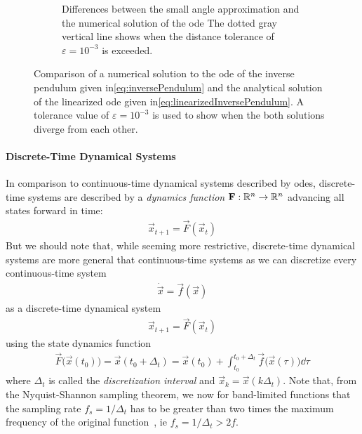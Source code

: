 \begin{figure}
\begin{subfigure}[t]{0.5\linewidth}
					\caption{Differences between the small angle approximation and the numerical solution of the \ac{ode}  The dotted gray vertical line shows when the distance tolerance of \( \varepsilon = 10^{-3} \) is exceeded.}
				\end{subfigure}
				\caption{Comparison of a numerical solution to the \ac{ode} of the inverse pendulum given in\eqref{eq:inversePendulum} and the analytical solution of the linearized \ac{ode} given in\eqref{eq:linearizedInversePendulum}. A tolerance value of \( \varepsilon = 10^{-3} \) is used to show when the both solutions diverge from each other.}
				\label{fig:inversePendulumApprox}
			\end{figure}

		\paragraph{Discrete-Time Dynamical Systems}
			In comparison to continuous-time dynamical systems described by \acp{ode}, discrete-time systems are described by a \emph{dynamics function} \( \boldsymbol{\mathrm{F}} : \mathbb{R}^n \to \mathbb{R}^n \) advancing all states forward in time:
			\begin{align*}
				\vec{x}_{t + 1} = \vec{F}(\vec{x}_t)
			\end{align*}
			But we should note that, while seeming more restrictive, discrete-time dynamical systems are more general that continuous-time systems as we can discretize every continuous-time system
			\begin{align*}
				\dot{\vec{x}} = \vec{f}(\vec{x})
			\end{align*}
			as a discrete-time dynamical system
			\begin{align*}
				\vec{x}_{t + 1} = \vec{F}(\vec{x}_t)
			\end{align*}
			using the state dynamics function
			\begin{align*}
				\vec{F}\big(\vec{x}(t_0)\big) = \vec{x}(t_0 + \Delta_t) = \vec{x}(t_0) + \int_{t_0}^{t_0 + \Delta_t} \! \vec{f}\big(\vec{x}(\tau)\big) \dd{\tau}
			\end{align*}
			where \( \Delta_t \) is called the \emph{discretization interval} and \( \vec{x}_k = \vec{x}(k \Delta_t) \). Note that, from the Nyquist-Shannon sampling theorem, we now for band-limited functions that the sampling rate \( f_s = 1/\Delta_t \) has to be greater than two times the maximum frequency of the original function~\cite{shannonCommunicationPresenceNoise1949}, \ac{ie} \( f_s = 1/\Delta_t > 2 f \).

